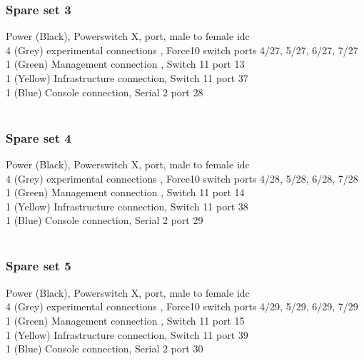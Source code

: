 \documentclass[a4paper]{article}
\begin{document}
\subsubsection{Spare set 3}
Power (Black), Powerswitch X, port, male to female idc\\
4 (Grey) experimental connections , Force10 switch ports 4/27, 5/27, 6/27, 7/27\\
1 (Green) Management connection , Switch 11 port 13\\
1 (Yellow) Infrastructure connection, Switch 11 port 37\\
1 (Blue) Console connection, Serial 2 port 28\\
\\
\subsubsection{Spare set 4}
Power (Black), Powerswitch X, port, male to female idc\\
4 (Grey) experimental connections , Force10 switch ports 4/28, 5/28, 6/28, 7/28\\
1 (Green) Management connection , Switch 11 port 14\\
1 (Yellow) Infrastructure connection, Switch 11 port 38\\
1 (Blue) Console connection, Serial 2 port 29\\
\\
\subsubsection{Spare set 5}
Power (Black), Powerswitch X, port, male to female idc\\
4 (Grey) experimental connections , Force10 switch ports 4/29, 5/29, 6/29, 7/29\\
1 (Green) Management connection , Switch 11 port 15\\
1 (Yellow) Infrastructure connection, Switch 11 port 39\\
1 (Blue) Console connection, Serial 2 port 30\\
\newpage






\end{document}
